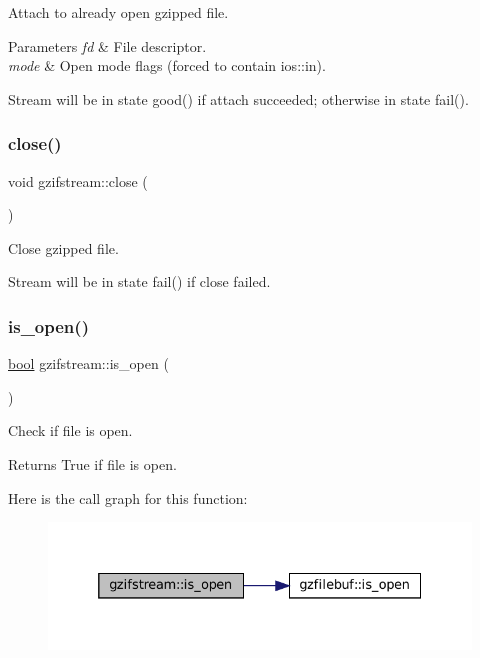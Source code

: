 Attach to already open gzipped file. 


\begin{DoxyParams}{Parameters}
{\em fd} & File descriptor. \\
\hline
{\em mode} & Open mode flags (forced to contain ios\+::in).\\
\hline
\end{DoxyParams}
Stream will be in state good() if attach succeeded; otherwise in state fail(). \mbox{\label{classgzifstream_a073fadd9dc90195c47a6ae2d863c8ace}} 
\subsubsection{\texorpdfstring{close()}{close()}}
{\footnotesize\ttfamily void gzifstream\+::close (\begin{DoxyParamCaption}{ }\end{DoxyParamCaption})}



Close gzipped file. 

Stream will be in state fail() if close failed. \mbox{\label{classgzifstream_a8e9de13b311b698ef0ccc276b71c7941}} 
\subsubsection{\texorpdfstring{is\+\_\+open()}{is\_open()}}
{\footnotesize\ttfamily \mbox{\hyperlink{libretro_8h_a4a26dcae73fb7e1528214a068aca317e}{bool}} gzifstream\+::is\+\_\+open (\begin{DoxyParamCaption}{ }\end{DoxyParamCaption})\hspace{0.3cm}{\ttfamily [inline]}}



Check if file is open. 

\begin{DoxyReturn}{Returns}
True if file is open. 
\end{DoxyReturn}
Here is the call graph for this function\+:
\nopagebreak
\begin{figure}[H]
\begin{center}
\leavevmode
\includegraphics[width=332pt]{classgzifstream_a8e9de13b311b698ef0ccc276b71c7941_cgraph}
\end{center}
\end{figure}
\mbox{\label{classgzifstream_a8105f9300d36dafbe8b10c204583f5a1}} 
